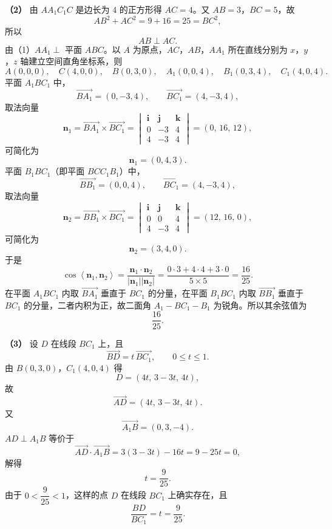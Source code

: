 \begin{answer}
\textbf{（2）} 由 $AA_1C_1C$ 是边长为 $4$ 的正方形得 $AC=4$。又 $AB=3$，$BC=5$，故
\nopagebreak[4]
\[AB^2+AC^2=9+16=25=BC^2,\]
所以
\nopagebreak[4]
\[AB\perp AC.\]
由（1）$AA_1\perp$ 平面 $ABC$。以 $A$ 为原点，$AC$，$AB$，$AA_1$ 所在直线分别为 $x$，$y$，$z$ 轴建立空间直角坐标系，则
\nopagebreak[4]
\[A(0,0,0),\quad C(4,0,0),\quad B(0,3,0),\quad A_1(0,0,4),\quad B_1(0,3,4),\quad C_1(4,0,4).\]
平面 $A_1BC_1$ 中，
\nopagebreak[4]
\[\overrightarrow{BA_1}=(0,-3,4),\qquad \overrightarrow{BC_1}=(4,-3,4),\]
取法向量
\nopagebreak[4]
\[\boldsymbol n_1=\overrightarrow{BA_1}\times\overrightarrow{BC_1}
=\begin{vmatrix}\boldsymbol i&\boldsymbol j&\boldsymbol k\\0&-3&4\\4&-3&4\end{vmatrix}
=(0,\,16,\,12),\]
可简化为
\nopagebreak[4]
\[\boldsymbol n_1=(0,4,3).\]
平面 $B_1BC_1$（即平面 $BCC_1B_1$）中，
\nopagebreak[4]
\[\overrightarrow{BB_1}=(0,0,4),\qquad \overrightarrow{BC_1}=(4,-3,4),\]
取法向量
\nopagebreak[4]
\[\boldsymbol n_2=\overrightarrow{BB_1}\times\overrightarrow{BC_1}
=\begin{vmatrix}\boldsymbol i&\boldsymbol j&\boldsymbol k\\0&0&4\\4&-3&4\end{vmatrix}
=(12,\,16,\,0),\]
可简化为
\nopagebreak[4]
\[\boldsymbol n_2=(3,4,0).\]
于是
\nopagebreak[4]
\[\cos\left\langle\boldsymbol n_1,\boldsymbol n_2\right\rangle
=\frac{\boldsymbol n_1\cdot\boldsymbol n_2}{|\boldsymbol n_1||\boldsymbol n_2|}
=\frac{0\cdot3+4\cdot4+3\cdot0}{5\times5}=\frac{16}{25}.\]
在平面 $A_1BC_1$ 内取 $\overrightarrow{BA_1}$ 垂直于 $BC_1$ 的分量，在平面 $B_1BC_1$ 内取 $\overrightarrow{BB_1}$ 垂直于 $BC_1$ 的分量，二者内积为正，故二面角 $A_1-BC_1-B_1$ 为锐角。所以其余弦值为
\nopagebreak[4]
\[\frac{16}{25}.\]

\textbf{（3）} 设 $D$ 在线段 $BC_1$ 上，且
\nopagebreak[4]
\[\overrightarrow{BD}=t\,\overrightarrow{BC_1},\qquad 0\leqslant t\leqslant1.\]
由 $B(0,3,0)$，$C_1(4,0,4)$ 得
\nopagebreak[4]
\[D=(4t,\,3-3t,\,4t),\]
故
\nopagebreak[4]
\[\overrightarrow{AD}=(4t,\,3-3t,\,4t).\]
又
\nopagebreak[4]
\[\overrightarrow{A_1B}=(0,3,-4).\]
$AD\perp A_1B$ 等价于
\nopagebreak[4]
\[\overrightarrow{AD}\cdot\overrightarrow{A_1B}=3(3-3t)-16t=9-25t=0,\]
解得
\nopagebreak[4]
\[t=\frac9{25}.\]
由于 $0<\dfrac9{25}<1$，这样的点 $D$ 在线段 $BC_1$ 上确实存在，且
\nopagebreak[4]
\[\frac{BD}{BC_1}=t=\frac9{25}.\]


\end{answer}
